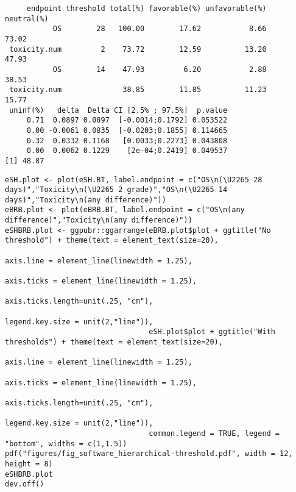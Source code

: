 \documentclass[12pt]{article}
\begin{document}
\begin{verbatim}
     endpoint threshold total(%) favorable(%) unfavorable(%) neutral(%)
           OS        28   100.00        17.62           8.66      73.02
 toxicity.num         2    73.72        12.59          13.20      47.93
           OS        14    47.93         6.20           2.88      38.53
 toxicity.num              38.85        11.85          11.23      15.77
 uninf(%)   delta  Delta CI [2.5% ; 97.5%]  p.value
     0.71  0.0897 0.0897  [-0.0014;0.1792] 0.053522
     0.00 -0.0061 0.0835  [-0.0203;0.1855] 0.114665
     0.32  0.0332 0.1168   [0.0033;0.2273] 0.043808
     0.00  0.0062 0.1229    [2e-04;0.2419] 0.049537
[1] 48.87
\end{verbatim}


\lstset{language=r,label= ,caption= ,captionpos=b,numbers=none}
\begin{lstlisting}
eSH.plot <- plot(eSH.BT, label.endpoint = c("OS\n(\U2265 28 days)","Toxicity\n(\U2265 2 grade)","OS\n(\U2265 14 days)","Toxicity\n(any difference)"))
eBRB.plot <- plot(eBRB.BT, label.endpoint = c("OS\n(any difference)","Toxicity\n(any difference)")) 
eSHBRB.plot <- ggpubr::ggarrange(eBRB.plot$plot + ggtitle("No threshold") + theme(text = element_text(size=20), 
                                                                                  axis.line = element_line(linewidth = 1.25),
                                                                                  axis.ticks = element_line(linewidth = 1.25),
                                                                                  axis.ticks.length=unit(.25, "cm"),
                                                                                  legend.key.size = unit(2,"line")),
                                 eSH.plot$plot + ggtitle("With thresholds") + theme(text = element_text(size=20), 
                                                                                    axis.line = element_line(linewidth = 1.25),
                                                                                    axis.ticks = element_line(linewidth = 1.25),
                                                                                    axis.ticks.length=unit(.25, "cm"),
                                                                                    legend.key.size = unit(2,"line")),
                                 common.legend = TRUE, legend = "bottom", widths = c(1,1.5))
pdf("figures/fig_software_hierarchical-threshold.pdf", width = 12, height = 8)
eSHBRB.plot
dev.off()
\end{lstlisting}
\end{document}
